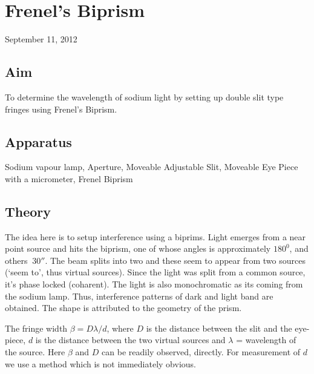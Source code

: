 \chapter{Frenel's Biprism}
\begin{flushright}
September 11, 2012
\end{flushright}
\section{Aim}
	To determine the wavelength of sodium light by setting up double slit type fringes using Frenel's Biprism.
\section{Apparatus}	
	Sodium vapour lamp, Aperture, Moveable Adjustable Slit, Moveable Eye Piece with a micrometer, Frenel Biprism

\section{Theory}
	The idea here is to setup interference using a biprims. Light emerges from a near point source and hits the biprism, one of whose angles is approximately $180^{0}$, and others $~30''$. The beam splits into two and these seem to appear from two sources (`seem to', thus virtual sources). Since the light was split from a common source, it's phase locked (coharent). The light is also monochromatic as its coming from the sodium lamp. Thus, interference patterns of dark and light band are obtained. The shape is attributed to the geometry of the prism.
	\par
	The fringe width $\beta = D \lambda / d$, where $D$ is the distance between the slit and the eye-piece, $d$ is the distance between the two virtual sources and $\lambda$ = wavelength of the source. Here $\beta$ and $D$ can be readily observed, directly. For measurement of $d$ we use a method which is not immediately obvious.


